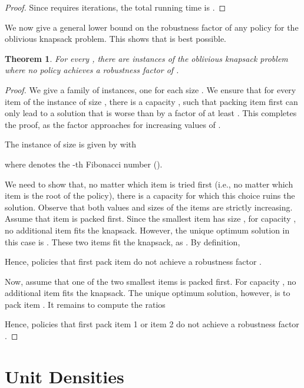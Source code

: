 \documentclass[11pt]{article}
\newtheorem{theorem}{Theorem}
\begin{document}
\begin{proof}
Since  requires  iterations, the total running
time is .  
\end{proof}
We now give a general lower bound on the robustness factor of any
policy for the oblivious knapsack problem. This shows that 
is best possible.
\begin{theorem}
For every , there are instances of the oblivious knapsack
problem where no policy achieves a robustness factor of .\end{theorem}
\begin{proof}
We give a family of instances, one for each size . We ensure
that for every item  of the instance of size , there is a
capacity , such that packing item  first can only lead to
a solution that is worse than  by a
factor of at least . This completes the proof, as the factor
approaches  for increasing values of .

The instance of size  is given by 
with

 where  denotes the -th Fibonacci number ().

We need to show that, no matter which item is tried first (i.e., no
matter which item is the root of the policy), there is a capacity
for which this choice ruins the solution. Observe that both values
and sizes of the items are strictly increasing. Assume that item 
is packed first. Since the smallest item has size , for
capacity , no additional
item fits the knapsack. However, the unique optimum solution in this
case is . These two
items fit the knapsack, as .
By definition, 

Hence, policies that first pack item  do not achieve a robustness
factor .

Now, assume that one of the two smallest items is packed first. For
capacity , no additional
item fits the knapsack. The unique optimum solution, however, is to
pack item . It remains to compute the ratios 

Hence, policies that first pack item 1 or item 2 do not achieve a
robustness factor .  
\end{proof}

\section{Unit Densities\label{sec:Unit-Densities}}
\end{document}

